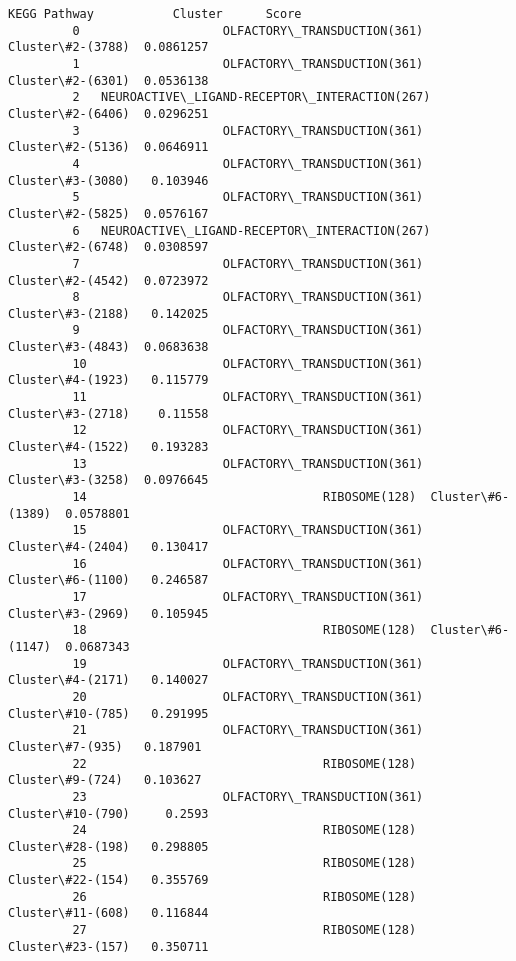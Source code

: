 \documentclass[11pt]{article}
\begin{document}
\begin{Verbatim}[commandchars=\\\{\}]
                                             KEGG Pathway           Cluster      Score  
         0                    OLFACTORY\_TRANSDUCTION(361)  Cluster\#2-(3788)  0.0861257  
         1                    OLFACTORY\_TRANSDUCTION(361)  Cluster\#2-(6301)  0.0536138  
         2   NEUROACTIVE\_LIGAND-RECEPTOR\_INTERACTION(267)  Cluster\#2-(6406)  0.0296251  
         3                    OLFACTORY\_TRANSDUCTION(361)  Cluster\#2-(5136)  0.0646911  
         4                    OLFACTORY\_TRANSDUCTION(361)  Cluster\#3-(3080)   0.103946  
         5                    OLFACTORY\_TRANSDUCTION(361)  Cluster\#2-(5825)  0.0576167  
         6   NEUROACTIVE\_LIGAND-RECEPTOR\_INTERACTION(267)  Cluster\#2-(6748)  0.0308597  
         7                    OLFACTORY\_TRANSDUCTION(361)  Cluster\#2-(4542)  0.0723972  
         8                    OLFACTORY\_TRANSDUCTION(361)  Cluster\#3-(2188)   0.142025  
         9                    OLFACTORY\_TRANSDUCTION(361)  Cluster\#3-(4843)  0.0683638  
         10                   OLFACTORY\_TRANSDUCTION(361)  Cluster\#4-(1923)   0.115779  
         11                   OLFACTORY\_TRANSDUCTION(361)  Cluster\#3-(2718)    0.11558  
         12                   OLFACTORY\_TRANSDUCTION(361)  Cluster\#4-(1522)   0.193283  
         13                   OLFACTORY\_TRANSDUCTION(361)  Cluster\#3-(3258)  0.0976645  
         14                                 RIBOSOME(128)  Cluster\#6-(1389)  0.0578801  
         15                   OLFACTORY\_TRANSDUCTION(361)  Cluster\#4-(2404)   0.130417  
         16                   OLFACTORY\_TRANSDUCTION(361)  Cluster\#6-(1100)   0.246587  
         17                   OLFACTORY\_TRANSDUCTION(361)  Cluster\#3-(2969)   0.105945  
         18                                 RIBOSOME(128)  Cluster\#6-(1147)  0.0687343  
         19                   OLFACTORY\_TRANSDUCTION(361)  Cluster\#4-(2171)   0.140027  
         20                   OLFACTORY\_TRANSDUCTION(361)  Cluster\#10-(785)   0.291995  
         21                   OLFACTORY\_TRANSDUCTION(361)   Cluster\#7-(935)   0.187901  
         22                                 RIBOSOME(128)   Cluster\#9-(724)   0.103627  
         23                   OLFACTORY\_TRANSDUCTION(361)  Cluster\#10-(790)     0.2593  
         24                                 RIBOSOME(128)  Cluster\#28-(198)   0.298805  
         25                                 RIBOSOME(128)  Cluster\#22-(154)   0.355769  
         26                                 RIBOSOME(128)  Cluster\#11-(608)   0.116844  
         27                                 RIBOSOME(128)  Cluster\#23-(157)   0.350711  

\end{Verbatim}
\end{document}

